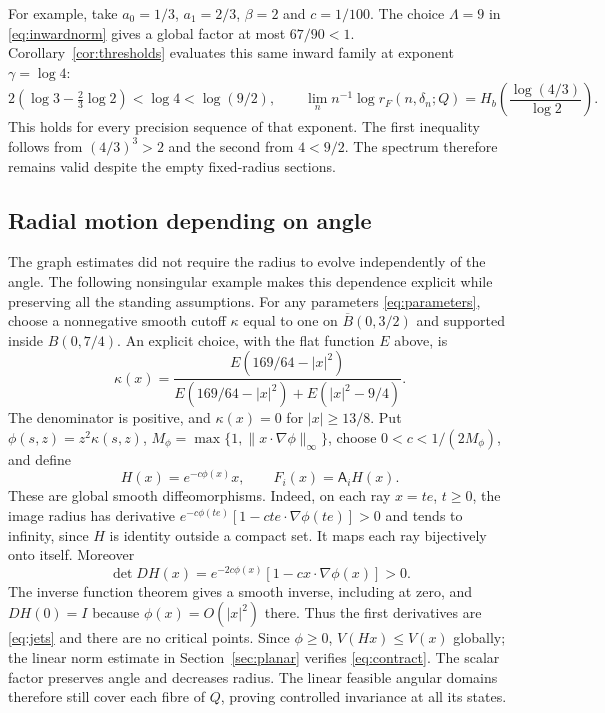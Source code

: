 \documentclass[11pt]{amsart}
\theoremstyle{definition}
\theoremstyle{remark}
\numberwithin{equation}{section}
\begin{document}
For example, take $a_0=1/3$, $a_1=2/3$, $\beta=2$ and $c=1/100$.
The choice $\Lambda=9$ in \eqref{eq:inwardnorm} gives a global
factor at most $67/90<1$. Corollary~\ref{cor:thresholds} evaluates
this same inward family at exponent $\gamma=\log4$:
\[
2\left(\log3-\tfrac23\log2\right)<\log4<\log(9/2),\qquad
\lim_n n^{-1}\log r_F(n,\delta_n;Q)
 =H_b\!\left(\frac{\log(4/3)}{\log2}\right).
\]
This holds for every precision sequence of that exponent.
The first inequality follows from $(4/3)^3>2$ and the second
from $4<9/2$. The spectrum therefore remains valid despite the
empty fixed-radius sections.


\subsection{Radial motion depending on angle}\label{sec:radialfeedback}
The graph estimates did not require the radius to evolve independently
of the angle. The following nonsingular example makes this dependence
explicit while preserving all the standing assumptions.
For any parameters \eqref{eq:parameters}, choose a nonnegative
smooth cutoff $\kappa$ equal to one on $\overline B(0,3/2)$ and
supported inside $B(0,7/4)$. An explicit choice, with the flat
function $E$ above, is
\[
\kappa(x)=\frac{E(169/64-|x|^2)}
 {E(169/64-|x|^2)+E(|x|^2-9/4)}.
\]
The denominator is positive, and $\kappa(x)=0$ for $|x|\ge13/8$.
Put $\phi(s,z)=z^2\kappa(s,z)$,
$M_\phi=\max\{1,\|x\cdot\nabla\phi\|_\infty\}$, choose
$0<c<1/(2M_\phi)$, and define
\begin{equation}\label{eq:radialfeedback}
H(x)=e^{-c\phi(x)}x,\qquad F_i(x)=\mathsf A_iH(x).
\end{equation}
These are global smooth diffeomorphisms. Indeed, on each ray
$x=te$, $t\ge0$, the image radius has derivative
$e^{-c\phi(te)}[1-cte\cdot\nabla\phi(te)]>0$ and tends to
infinity, since $H$ is identity outside a compact set. It maps
each ray bijectively onto itself. Moreover
\[
\det DH(x)=e^{-2c\phi(x)}[1-cx\cdot\nabla\phi(x)]>0.
\]
The inverse function theorem gives a smooth inverse, including
at zero, and $DH(0)=I$ because $\phi(x)=O(|x|^2)$ there.
Thus the first derivatives are \eqref{eq:jets} and there are no
critical points. Since $\phi\ge0$, $V(Hx)\le V(x)$ globally;
the linear norm estimate in Section~\ref{sec:planar} verifies
\eqref{eq:contract}. The scalar factor preserves angle and decreases
radius. The linear feasible angular domains therefore still cover
each fibre of $Q$, proving controlled invariance at all its states.
\end{document}

